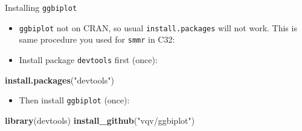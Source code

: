 \documentclass[ignorenonframetext,]{beamer}
\newenvironment{Shaded}{\begin{snugshade}}{\end{snugshade}}
\newcommand{\KeywordTok}[1]{\textcolor[rgb]{0.13,0.29,0.53}{\textbf{#1}}}
\newcommand{\NormalTok}[1]{#1}
\newcommand{\StringTok}[1]{\textcolor[rgb]{0.31,0.60,0.02}{#1}}
\providecommand{\tightlist}{%
  \setlength{\itemsep}{0pt}\setlength{\parskip}{0pt}}
\begin{document}
\begin{frame}[fragile]{Installing \texttt{ggbiplot}}
\protect\hypertarget{installing-ggbiplot-1}{}

\begin{itemize}
\item
  \texttt{ggbiplot} not on CRAN, so usual \texttt{install.packages} will
  not work. This is same procedure you used for \texttt{smmr} in C32:
\item
  Install package \texttt{devtools} first (once):
\end{itemize}

\begin{Shaded}
\begin{Highlighting}[]
\KeywordTok{install.packages}\NormalTok{(}\StringTok{"devtools"}\NormalTok{)}
\end{Highlighting}
\end{Shaded}

\begin{itemize}
\tightlist
\item
  Then install \texttt{ggbiplot} (once):
\end{itemize}

\begin{Shaded}
\begin{Highlighting}[]
\KeywordTok{library}\NormalTok{(devtools)}
\KeywordTok{install_github}\NormalTok{(}\StringTok{"vqv/ggbiplot"}\NormalTok{)}
\end{Highlighting}
\end{Shaded}

\end{frame}
\end{document}

